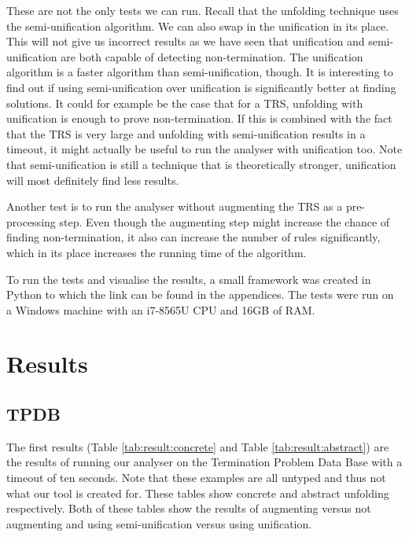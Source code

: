 These are not the only tests we can run. Recall that the unfolding technique uses the semi-unification algorithm. We can also swap in the unification in its place. This will not give us incorrect results as we have seen that unification and semi-unification are both capable of detecting non-termination. The unification algorithm is a faster algorithm than semi-unification, though. It is interesting to find out if using semi-unification over unification is significantly better at finding solutions. It could for example be the case that for a TRS, unfolding with unification is enough to prove non-termination. If this is combined with the fact that the TRS is very large and unfolding with semi-unification results in a timeout, it might actually be useful to run the analyser with unification too. Note that semi-unification is still a technique that is theoretically stronger, unification will most definitely find less results.  

Another test is to run the analyser without augmenting the TRS as a pre-processing step. Even though the augmenting step might increase the chance of finding non-termination, it also can increase the number of rules significantly, which in its place increases the running time of the algorithm. 

To run the tests and visualise the results, a small framework was created in Python to which the link can be found in the appendices. The tests were run on a Windows machine with an i7-8565U CPU and 16GB of RAM. 

\section{Results}
\subsection{TPDB}
The first results (Table \ref{tab:result:concrete} and Table \ref{tab:result:abstract}) are the results of running our analyser on the Termination Problem Data Base\cite{TermPortal} with a timeout of ten seconds. Note that these examples are all untyped and thus not what our tool is created for. These tables show concrete and abstract unfolding respectively. Both of these tables show the results of augmenting versus not augmenting and using semi-unification versus using unification.  

